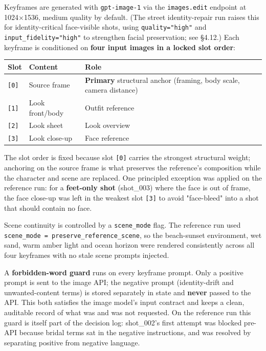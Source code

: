 \documentclass[10pt,twocolumn,letterpaper]{article}
\begin{document}
Keyframes are generated with \texttt{gpt-image-1} via the \texttt{images.edit} endpoint at 1024$\times$1536, medium quality by default. (The street identity-repair run raises this for identity-critical face-visible shots, using \texttt{quality="high"} and \texttt{input\_fidelity="high"} to strengthen facial preservation; see \S{}4.12.) Each keyframe is conditioned on \textbf{four input images in a locked slot order}:

\begin{table}[t]
\centering
\footnotesize
\begin{tabularx}{\textwidth}{ll>{\RaggedRight\arraybackslash}X}
\toprule
Slot & Content & Role \\
\midrule
\texttt{[0]} & Source frame & \textbf{Primary} structural anchor (framing, body scale, camera distance) \\
\texttt{[1]} & Look front/body & Outfit reference \\
\texttt{[2]} & Look sheet & Look overview \\
\texttt{[3]} & Look close-up & Face reference \\
\bottomrule
\end{tabularx}
\end{table}

The slot order is fixed because slot \texttt{[0]} carries the strongest structural weight; anchoring on the source frame is what preserves the reference's composition while the character and scene are replaced. One principled exception was applied on the reference run: for a \textbf{feet-only shot} (shot\_003) where the face is out of frame, the face close-up was left in the weakest slot \texttt{[3]} to avoid "face-bleed" into a shot that should contain no face.

Scene continuity is controlled by a \texttt{scene\_mode} flag. The reference run used \texttt{scene\_mode = preserve\_reference\_scene}, so the beach-sunset environment, wet sand, warm amber light and ocean horizon were rendered consistently across all four keyframes with no stale scene prompts injected.

A \textbf{forbidden-word guard} runs on every keyframe prompt. Only a positive prompt is sent to the image API; the negative prompt (identity-drift and unwanted-content terms) is stored separately in state and \textbf{never} passed to the API. This both satisfies the image model's input contract and keeps a clean, auditable record of what was and was not requested. On the reference run this guard is itself part of the decision log: shot\_002's first attempt was blocked pre-API because bridal terms sat in the negative instructions, and was resolved by separating positive from negative language.
\end{document}
